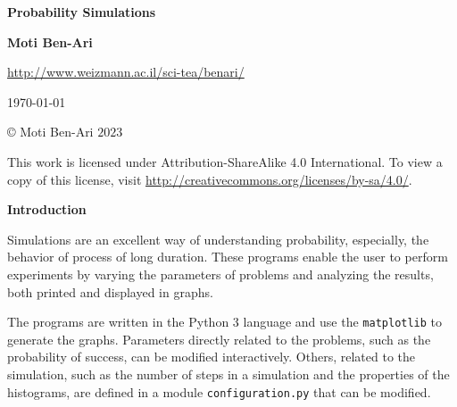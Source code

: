 

\thispagestyle{empty}

\begin{center}
\textbf{\LARGE Probability Simulations}

\bigskip
\bigskip
\bigskip

\textbf{\Large Moti Ben-Ari}

\bigskip

\url{http://www.weizmann.ac.il/sci-tea/benari/}

\bigskip
\bigskip
\bigskip

%

\today

\end{center}

\vfill

\begin{center}
\copyright{} Moti Ben-Ari $2023$
 \end{center}
 
\begin{small}
This work is licensed under Attribution-ShareAlike 4.0 International. To view a copy of this license, visit \url{http://creativecommons.org/licenses/by-sa/4.0/}.
\end{small}
\newpage

\tableofcontents

\newpage

\begin{center}
\textbf{\LARGE Introduction}
\end{center}


\bigskip

Simulations are an excellent way of understanding probability, especially, the behavior of process of long duration. These programs enable the user to perform experiments by varying the parameters of problems and analyzing the results, both printed and displayed in graphs.

The programs are written in the Python 3 language and use the \verb+matplotlib+ to generate the graphs. Parameters directly related to the problems, such as the probability of success, can be modified interactively. Others, related to the simulation, such as the number of steps in a simulation and the properties of the histograms, are defined in a module \verb+configuration.py+ that can be modified.

